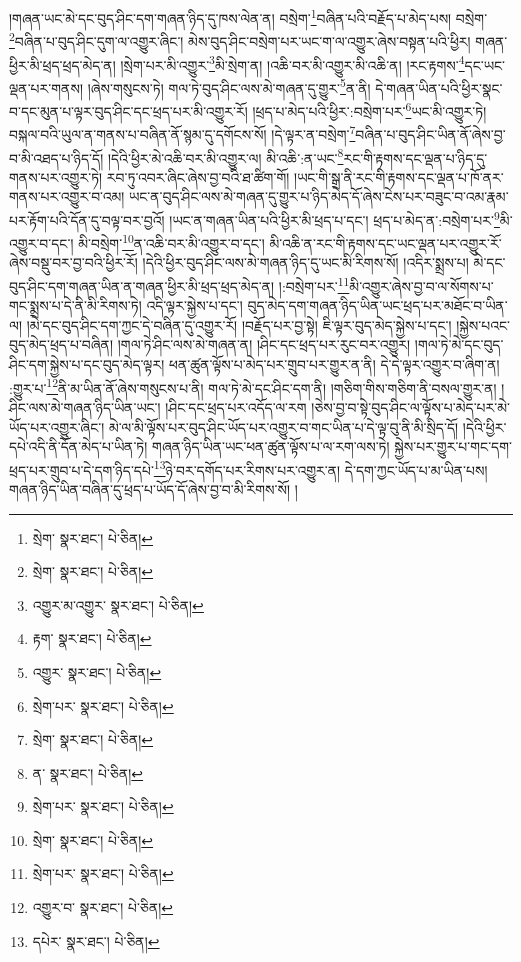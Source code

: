 །གཞན་ཡང་མེ་དང་བུད་ཤིང་དག་གཞན་ཉིད་དུ་ཁས་ལེན་ན། བསྲེག་\footnote{སྲེག་  སྣར་ཐང་།  པེ་ཅིན། }བཞིན་པའི་བརྗོད་པ་མེད་པས། བསྲེག་\footnote{སྲེག་  སྣར་ཐང་།  པེ་ཅིན། }བཞིན་པ་བུད་ཤིང་དུག་ལ་འགྱུར་ཞིང་། མེས་བུད་ཤིང་བསྲེག་པར་ཡང་ག་ལ་འགྱུར་ཞེས་བསྟན་པའི་ཕྱིར། གཞན་ཕྱིར་མི་ཕྲད་ཕྲད་མེད་ན། །སྲེག་པར་མི་འགྱུར་\footnote{འགྱུར་མ་འགྱུར་  སྣར་ཐང་།  པེ་ཅིན། }མི་སྲེག་ན། །འཆི་བར་མི་འགྱུར་མི་འཆི་ན། །རང་རྟགས་\footnote{རྟག་  སྣར་ཐང་།  པེ་ཅིན། }དང་ཡང་ལྡན་པར་གནས། །ཞེས་གསུངས་ཏེ། གལ་ཏེ་བུད་ཤིང་ལས་མེ་གཞན་དུ་གྱུར་\footnote{འགྱུར་  སྣར་ཐང་།  པེ་ཅིན། }ན་ནི། དེ་གཞན་ཡིན་པའི་ཕྱིར་སྣང་བ་དང་མུན་པ་ལྟར་བུད་ཤིང་དང་ཕྲད་པར་མི་འགྱུར་རོ། །ཕྲད་པ་མེད་པའི་ཕྱིར་:བསྲེག་པར་\footnote{སྲེག་པར་  སྣར་ཐང་།  པེ་ཅིན། }ཡང་མི་འགྱུར་ཏེ། བསྐལ་བའི་ཡུལ་ན་གནས་པ་བཞིན་ནོ་སྙམ་དུ་དགོངས་སོ། །དེ་ལྟར་ན་བསྲེག་\footnote{སྲེག་  སྣར་ཐང་།  པེ་ཅིན། }བཞིན་པ་བུད་ཤིང་ཡིན་ནོ་ཞེས་བྱ་བ་མི་འཐད་པ་ཉིད་དོ། །དེའི་ཕྱིར་མེ་འཆི་བར་མི་འགྱུར་ལ། མི་འཆི་:ན་ཡང་\footnote{ན་  སྣར་ཐང་།  པེ་ཅིན། }རང་གི་རྟགས་དང་ལྡན་པ་ཉིད་དུ་གནས་པར་འགྱུར་ཏེ། རབ་ཏུ་འབར་ཞིང་ཞེས་བྱ་བའི་ཐ་ཚིག་གོ། །ཡང་གི་སྒྲ་ནི་རང་གི་རྟགས་དང་ལྡན་པ་ཁོ་ནར་གནས་པར་འགྱུར་བ་འམ། ཡང་ན་བུད་ཤིང་ལས་མེ་གཞན་དུ་གྱུར་པ་ཉིད་མེད་དོ་ཞེས་ངེས་པར་བཟུང་བ་འམ་རྣམ་པར་རྟོག་པའི་དོན་དུ་བལྟ་བར་བྱའོ། །ཡང་ན་གཞན་ཡིན་པའི་ཕྱིར་མི་ཕྲད་པ་དང་། ཕྲད་པ་མེད་ན་:བསྲེག་པར་\footnote{སྲེག་པར་  སྣར་ཐང་།  པེ་ཅིན། }མི་འགྱུར་བ་དང་། མི་བསྲེག་\footnote{སྲེག་  སྣར་ཐང་།  པེ་ཅིན། }ན་འཆི་བར་མི་འགྱུར་བ་དང་། མི་འཆི་ན་རང་གི་རྟགས་དང་ཡང་ལྡན་པར་འགྱུར་རོ་ཞེས་བསྡུ་བར་བྱ་བའི་ཕྱིར་རོ། །དེའི་ཕྱིར་བུད་ཤིང་ལས་མེ་གཞན་ཉིད་དུ་ཡང་མི་རིགས་སོ། །འདིར་སྨྲས་པ། མེ་དང་བུད་ཤིང་དག་གཞན་ཡིན་ན་གཞན་ཕྱིར་མི་ཕྲད་ཕྲད་མེད་ན། །:བསྲེག་པར་\footnote{སྲེག་པར་  སྣར་ཐང་།  པེ་ཅིན། }མི་འགྱུར་ཞེས་བྱ་བ་ལ་སོགས་པ་གང་སྨྲས་པ་དེ་ནི་མི་རིགས་ཏེ། འདི་ལྟར་སྐྱེས་པ་དང་། བུད་མེད་དག་གཞན་ཉིད་ཡིན་ཡང་ཕྲད་པར་མཐོང་བ་ཡིན་ལ། །མེ་དང་བུད་ཤིང་དག་ཀྱང་དེ་བཞིན་དུ་འགྱུར་རོ། །བརྗོད་པར་བྱ་སྟེ། ཇི་ལྟར་བུད་མེད་སྐྱེས་པ་དང་། །སྐྱེས་པའང་བུད་མེད་ཕྲད་པ་བཞིན། །གལ་ཏེ་ཤིང་ལས་མེ་གཞན་ན། །ཤིང་དང་ཕྲད་པར་རུང་བར་འགྱུར། །གལ་ཏེ་མེ་དང་བུད་ཤིང་དག་སྐྱེས་པ་དང་བུད་མེད་ལྟར། ཕན་ཚུན་ལྟོས་པ་མེད་པར་གྲུབ་པར་གྱུར་ན་ནི། དེ་དེ་ལྟར་འགྱུར་བ་ཞིག་ན། :གྱུར་པ་\footnote{འགྱུར་བ་  སྣར་ཐང་།  པེ་ཅིན། }ནི་མ་ཡིན་ནོ་ཞེས་གསུངས་པ་ནི། གལ་ཏེ་མེ་དང་ཤིང་དག་ནི། །གཅིག་གིས་གཅིག་ནི་བསལ་གྱུར་ན། །ཤིང་ལས་མེ་གཞན་ཉིད་ཡིན་ཡང་། །ཤིང་དང་ཕྲད་པར་འདོད་ལ་རག །ཅེས་བྱ་བ་སྟེ་བུད་ཤིང་ལ་ལྟོས་པ་མེད་པར་མེ་ཡོད་པར་འགྱུར་ཞིང་། མེ་ལ་མི་ལྟོས་པར་བུད་ཤིང་ཡོད་པར་འགྱུར་བ་གང་ཡིན་པ་དེ་ལྟ་བུ་ནི་མི་སྲིད་དོ། །དེའི་ཕྱིར་དཔེ་འདི་ནི་དོན་མེད་པ་ཡིན་ཏེ། གཞན་ཉིད་ཡིན་ཡང་ཕན་ཚུན་ལྟོས་པ་ལ་རག་ལས་ཏེ། སྐྱེས་པར་གྱུར་པ་གང་དག་ཕྲད་པར་གྲུབ་པ་དེ་དག་ཉིད་དཔེ་\footnote{དཔེར་  སྣར་ཐང་།  པེ་ཅིན། }ཉེ་བར་དགོད་པར་རིགས་པར་འགྱུར་ན། དེ་དག་ཀྱང་ཡོད་པ་མ་ཡིན་པས། གཞན་ཉིད་ཡིན་བཞིན་དུ་ཕྲད་པ་ཡོད་དོ་ཞེས་བྱ་བ་མི་རིགས་སོ། །
